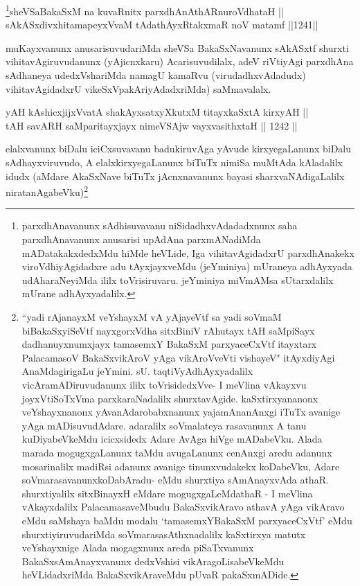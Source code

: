 \begin{shl}
\footnote{parxdhAnavanunx sAdhisuvavanu niSidadhxvAdadadxnunx saha parxdhAnavanunx anusarisi upAdAna parxmANadiMda mADatakakxdedxMdu hiMde heVLide, Iga vihitavAgidadxrU parxdhAnakekx viroVdhiyAgidadxre adu tAyxjayxveMdu (jeYminiya) mUraneya adhAyxyada udAharaNeyiMda ililx toVrisiruvaru. jeYminiya miVmAMsa sUtarxdalilx mUrane adhAyxyadalilx.}sheVSaBakaSxM na kuvaRnitx parxdhAnAthARnuroVdhataH || \\
sAkASxdivxhitamapeyxVvaM tAdathAyxRtakxmaR noV matamf \hfill ||1241||  
\end{shl}

\begin{artha}
muKayxvanunx anusarisuvudariMda sheVSa BakaSxNavanunx sAkASxtf shurxti vihitavAgiruvudanunx (yAjicnxkaru) Acarisuvudilalx, adeV riVtiyAgi parxdhAna sAdhaneya udedxVshariMda namagU kamaRvu (virudadhxvAdadudx) vihitavAgidadxrU vikeSxVpakAriyAdadxriMda) saMmavalalx.
\end{artha}


\begin{shl}
yAH kAshicxjijxVvatA shakAyxsatxyXkutxM titayxkaSxtA kirxyAH || \\
tAH savARH saMparitayxjayx nimeVSAjw vayxvasithxtaH \hfill || 1242 ||  
\end{shl}

\begin{artha}
elalxvanunx biDalu iciCxsuvavanu badukiruvAga yAvude kirxyegaLanunx biDalu sAdhayxviruvudo, A elalxkirxyegaLanunx biTuTx nimiSa muMtAda kAladalilx idudx (aMdare AkaSxNave biTuTx jAcnxnavanunx bayasi sharxvaNAdigaLalilx niratanAgabeVku)\footnote{``yadi rAjanayxM veYshayxM vA yAjayeVtf sa yadi soVmaM biBakaSxyiSeVtf nayxgorxVdha sitxBiniV rAhutayx tAH saMpiSayx dadhanuyxnumxjayx tamasemxY BakaSxM parxyaceCxVtf itayxtarx PalacamasoV BakaSxvikAroV yAga vikAroVveVti vishayeV" itAyxdiyAgi AnaMdagirigaLu jeYmini. sU. taqtiVyAdhAyxyadalilx vicAramADiruvudanunx ililx toVrisidedxVve- I meVlina vAkayxvu joyxVtiSoTxVma parxkaraNadalilx shurxtavAgide. kaSxtirxyananonx veYshayxnanonx yAvanAdarobabxnanunx yajamAnanAnxgi iTuTx avanige yAga mADisuvudAdare. adaralilx soVmalateya rasavanunx A tanu kuDiyabeVkeMdu icicxsidedx Adare AvAga hiVge mADabeVku. Alada marada mogugxgaLanunx taMdu avugaLanunx cenAnxgi aredu adanunx mosarinalilx madiRsi adanunx avanige tinunxvudakekx koDabeVku, Adare soVmarasavanunx\break koDabAradu- eMdu shurxtiya sAmAnayxvAda athaR. shurxtiyalilx sitxBinayxH eMdare mogugxgaLeMdathaR - I meVlina vAkayxdalilx PalacamasaveMbudu BakaSxvikAravo athavA yAga vikAravo eMdu saMshaya baMdu modalu `tamasemxYBakaSxM parxyaceCxVtf' eMdu shurxtiyiruvudariMda soVmarasasAthxnadalilx kaSxtirxya matutx veYshayxnige Alada mogagxnunx areda piSaTxvanunx BakaSxsAmAnayxvanunx dedxVshisi vikAragoLisabeVkeMdu heVLidadxriMda BakaSxvikAraveMdu pUvaR pakaSxmADide.}	
\end{artha}

